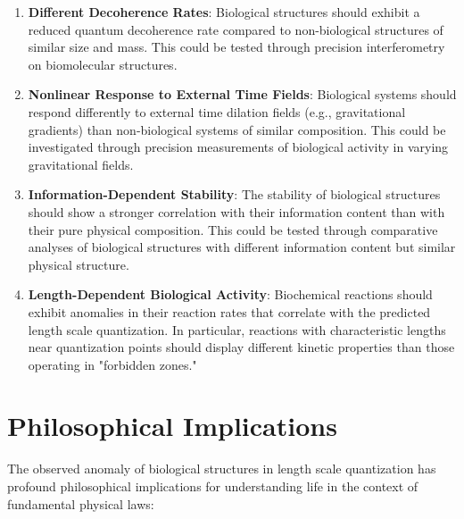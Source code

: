 \documentclass[12pt,a4paper]{article}
\begin{document}
	\begin{enumerate}
		\item \textbf{Different Decoherence Rates}: Biological structures should exhibit a reduced quantum decoherence rate compared to non-biological structures of similar size and mass. This could be tested through precision interferometry on biomolecular structures.
		
		\item \textbf{Nonlinear Response to External Time Fields}: Biological systems should respond differently to external time dilation fields (e.g., gravitational gradients) than non-biological systems of similar composition. This could be investigated through precision measurements of biological activity in varying gravitational fields.
		
		\item \textbf{Information-Dependent Stability}: The stability of biological structures should show a stronger correlation with their information content than with their pure physical composition. This could be tested through comparative analyses of biological structures with different information content but similar physical structure.
		
		\item \textbf{Length-Dependent Biological Activity}: Biochemical reactions should exhibit anomalies in their reaction rates that correlate with the predicted length scale quantization. In particular, reactions with characteristic lengths near quantization points should display different kinetic properties than those operating in "forbidden zones."
	\end{enumerate}
	
	\section{Philosophical Implications}
	\label{sec:philosophische_implikationen}
	
	The observed anomaly of biological structures in length scale quantization has profound philosophical implications for understanding life in the context of fundamental physical laws:
	
\end{document}
